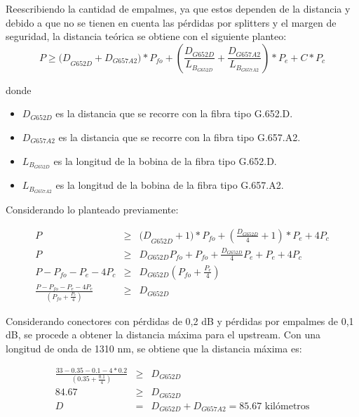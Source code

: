 \documentclass[11pt,a4paper]{article}
\begin{document}


Reescribiendo la cantidad de empalmes, ya que estos dependen de la distancia y debido a que no se tienen en cuenta las pérdidas por splitters y el margen de seguridad, la distancia teórica se obtiene con el siguiente planteo:
\begin{equation}
  P \geq {(D}_{G652D}+D_{G657A2})*P_{fo}+\left(\frac{D_{G652D}}{L_{B_{G652D}}}+\frac{D_{G657A2}}{L_{B_{G657A2}}}\right)*P_e+C*P_c
\end{equation}
 
donde

\begin{itemize}
  \item  $D_{G652D}$ es la distancia que se recorre con la fibra tipo G.652.D.
  \item  $D_{G657A2}$ es la distancia que se recorre con la fibra tipo G.657.A2.
  \item  $L_{B_{G652D}}$ es la longitud de la bobina de la fibra tipo G.652.D.
  \item  $L_{B_{G657A2}}$ es la longitud de la bobina de la fibra tipo G.657.A2.
  \end{itemize}
  
  Considerando lo planteado previamente:

  \begin{eqnarray*}
    P &\geq& {(D}_{G652D}+1)*P_{fo}+\left(\frac{D_{G652D}}{4}+1\right)*P_e+4P_c \\
    P &\geq& D_{G652D}P_{fo}+P_{fo}+\frac{D_{G652D}}{4}P_e+P_e+4P_c \\
    P-P_{fo}-P_e-4P_c &\geq& D_{G652D}\left(P_{fo}+\frac{P_e}{4}\right)  \\
    \frac{P-P_{fo}-P_e-4P_c}{\left(P_{fo}+\frac{P_e}{4}\right)} &\geq& D_{G652D}
  \end{eqnarray*}
  
  Considerando conectores con pérdidas de 0,2 dB y pérdidas por empalmes de 0,1 dB, se procede a obtener la distancia máxima para el upstream. Con una longitud de onda de 1310 nm, se obtiene que la distancia máxima es:

  \begin{eqnarray*}
    \frac{33-0.35-0.1-4*0.2}{\left(0.35+\frac{0.1}{4}\right)} &\geq& D_{G652D} \\
    84.67 &\geq& D_{G652D} \\
    D&=&D_{G652D}+D_{G657A2}=85.67 \text{ kilómetros}
  \end{eqnarray*}
\end{document}
